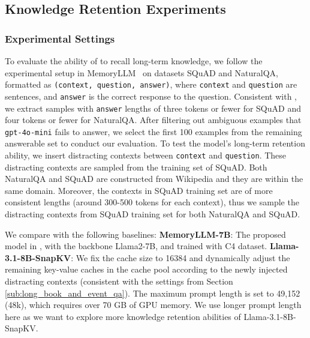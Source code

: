 \subsection{Knowledge Retention Experiments}
\label{sub:knowledge_retention_experiments}
\subsubsection{Experimental Settings}
To evaluate the ability of \ours to recall long-term knowledge, we follow the experimental setup in MemoryLLM~\citep{memoryllm} on datasets SQuAD and NaturalQA, formatted as \texttt{(context, question, answer)}, where \texttt{context} and \texttt{question} are sentences, and \texttt{answer} is the correct response to the question. Consistent with \citet{memoryllm}, we extract samples with \texttt{answer} lengths of three tokens or fewer for SQuAD and four tokens or fewer for NaturalQA. After filtering out ambiguous examples that \texttt{gpt-4o-mini} fails to answer, we select the first 100 examples from the remaining answerable set to conduct our evaluation. To test the model's long-term retention ability, we insert distracting contexts between \texttt{context} and \texttt{question}. These distracting contexts are sampled from the training set of SQuAD. Both NaturalQA and SQuAD are constructed from Wikipedia and they are within the same domain. Moreover, the contexts in SQuAD training set are of more consistent lengths (around 300-500 tokens for each context), thus we sample the distracting contexts from SQuAD training set for both NaturalQA and SQuAD. 

We compare with the following baselines: 
\textbf{MemoryLLM-7B}: The proposed model in \citet{memoryllm}, with the backbone Llama2-7B, and trained with C4 dataset. 
\textbf{Llama-3.1-8B-SnapKV}: We fix the cache size to 16384 and dynamically adjust the remaining key-value caches in the cache pool according to the newly injected distracting contexts (consistent with the settings from Section \ref{sub:long_book_and_event_qa}). The maximum prompt length is set to 49,152 (48k), which requires over 70 GB of GPU memory. We use longer prompt length here as we want to explore more knowledge retention abilities of Llama-3.1-8B-SnapKV. 



\vspace{-5pt}
